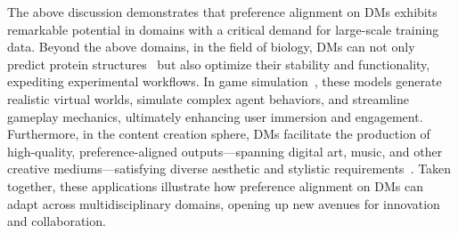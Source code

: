 The above discussion demonstrates that preference alignment on DMs exhibits remarkable potential in domains with a critical demand for large-scale training data. Beyond the above domains, in the field of biology, DMs can not only predict protein structures~\citep{wu2024protein} but also optimize their stability and functionality, expediting experimental workflows. In game simulation~\citep{menapace2024promptable}, these models generate realistic virtual worlds, simulate complex agent behaviors, and streamline gameplay mechanics, ultimately enhancing user immersion and engagement. Furthermore, in the content creation sphere, DMs facilitate the production of high-quality, preference-aligned outputs—spanning digital art, music, and other creative mediums—satisfying diverse aesthetic and stylistic requirements~\citep{lin2023magic3d}. Taken together, these applications illustrate how preference alignment on DMs can adapt across multidisciplinary domains, opening up new avenues for innovation and collaboration.



